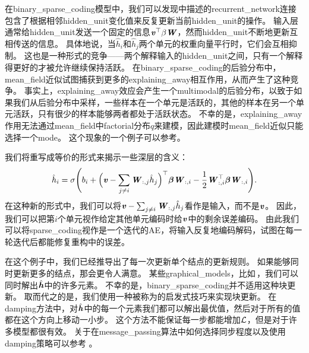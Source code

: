 在\gls{binary_sparse_coding}模型中，我们可以发现中描述的\gls{recurrent_network}连接包含了根据相邻\gls{hidden_unit}变化值来反复更新当前\gls{hidden_unit}的操作。   %
输入层通常给\gls{hidden_unit}发送一个固定的信息$\boldsymbol{\mathit{v}}^{\top}\beta\boldsymbol{\mathit{W}}$，然而\gls{hidden_unit}不断地更新互相传送的信息。
具体地说，当$\hat{h}_i$和$\hat{h}_j$两个单元的权重向量平行时，它们会互相抑制。
这也是一种形式的竞争——两个解释输入的\gls{hidden_unit}之间，只有一个解释得更好的才被允许继续保持活跃。
在\gls{binary_sparse_coding}的后验分布中，\gls{mean_field}近似试图捕获到更多的\gls{explaining_away}相互作用，从而产生了这种竞争。   %
事实上，\gls{explaining_away}效应会产生一个\gls{multimodal}的后验分布，以致于如果我们从后验分布中采样，一些样本在一个单元是活跃的，其他的样本在另一个单元活跃，只有很少的样本能够两者都处于活跃状态。
不幸的是，\gls{explaining_away}作用无法通过\gls{mean_field}中\gls{factorial}分布$q$来建模，因此建模时\gls{mean_field}近似只能选择一个\gls{mode}。
这个现象的一个例子可以参考。




我们将重写成等价的形式来揭示一些深层的含义：
\begin{align}
\hat{h}_i = \sigma\Bigg(b_i + \Big(\boldsymbol{\mathit{v}} - \sum_{j\neq i} \boldsymbol{\mathit{W}}_{:,j}\hat{h}_j\Big)^{\top} {\boldsymbol{\beta}}\boldsymbol{\mathit{W}}_{:,i} - \frac{1}{2} \boldsymbol{\mathit{W}}_{:,i}^{\top} {\boldsymbol{\beta}} \boldsymbol{\mathit{W}}_{:,i}\Bigg). 
\end{align}
在这种新的形式中，我们可以将$\boldsymbol{\mathit{v}} - \sum_{j\neq i} \boldsymbol{\mathit{W}}_{:,j}\hat{h}_j$看作是输入，而不是$\boldsymbol{\mathit{v}}$。
因此，我们可以把第$i$个单元视作给定其他单元编码时给$\boldsymbol{\mathit{v}}$中的剩余误差编码。
由此我们可以将\gls{sparse_coding}视作是一个迭代的\gls{AE}，将输入反复地编码解码，试图在每一轮迭代后都能修复重构中的误差。


在这个例子中，我们已经推导出了每一次更新单个结点的更新规则。
如果能够同时更新更多的结点，那会更令人满意。
某些\gls{graphical_models}，比如\,，我们可以同时解出$\hat{\boldsymbol{\mathit{h}}}$中的许多元素。
不幸的是，\gls{binary_sparse_coding}并不适用这种块更新。
取而代之的是，我们使用一种被称为的启发式技巧来实现块更新。
在\gls{damping}方法中，对$\hat{\boldsymbol{\mathit{h}}}$中的每一个元素我们都可以解出最优值，然后对于所有的值都在这个方向上移动一小步。
这个方法不能保证每一步都能增加$\mathcal{L}$，但是对于许多模型都很有效。
关于在\gls{message_passing}算法中如何选择同步程度以及使用\gls{damping}策略可以参考 \citet{koller-book2009} 。




\subsection{}
\label{sec:calculus_of_variations}

